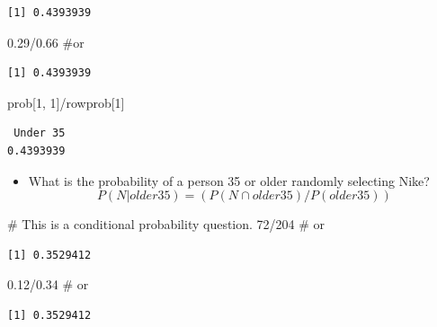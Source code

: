 \documentclass[
  letterpaper,
  DIV=11,
  numbers=noendperiod]{scrreprt}
\newenvironment{Shaded}{\begin{snugshade}}{\end{snugshade}}
\newcommand{\CommentTok}[1]{\textcolor[rgb]{0.37,0.37,0.37}{#1}}
\newcommand{\DecValTok}[1]{\textcolor[rgb]{0.68,0.00,0.00}{#1}}
\newcommand{\FloatTok}[1]{\textcolor[rgb]{0.68,0.00,0.00}{#1}}
\newcommand{\NormalTok}[1]{\textcolor[rgb]{0.00,0.23,0.31}{#1}}
\newcommand{\SpecialCharTok}[1]{\textcolor[rgb]{0.37,0.37,0.37}{#1}}
\providecommand{\tightlist}{%
  \setlength{\itemsep}{0pt}\setlength{\parskip}{0pt}}\usepackage{longtable,booktabs,array}
\begin{document}
\begin{verbatim}
[1] 0.4393939
\end{verbatim}

\begin{Shaded}
\begin{Highlighting}[]
\FloatTok{0.29}\SpecialCharTok{/}\FloatTok{0.66}  \CommentTok{\#or}
\end{Highlighting}
\end{Shaded}

\begin{verbatim}
[1] 0.4393939
\end{verbatim}

\begin{Shaded}
\begin{Highlighting}[]
\NormalTok{prob[}\DecValTok{1}\NormalTok{, }\DecValTok{1}\NormalTok{]}\SpecialCharTok{/}\NormalTok{rowprob[}\DecValTok{1}\NormalTok{]}
\end{Highlighting}
\end{Shaded}

\begin{verbatim}
 Under 35 
0.4393939 
\end{verbatim}

\begin{itemize}
\tightlist
\item
  What is the probability of a person 35 or older randomly selecting
  Nike? \[P(N|older35) = (P(N \cap older35)/P(older35))\]
\end{itemize}

\begin{Shaded}
\begin{Highlighting}[]
\CommentTok{\# This is a conditional probability question.}
\DecValTok{72}\SpecialCharTok{/}\DecValTok{204}  \CommentTok{\# or}
\end{Highlighting}
\end{Shaded}

\begin{verbatim}
[1] 0.3529412
\end{verbatim}

\begin{Shaded}
\begin{Highlighting}[]
\FloatTok{0.12}\SpecialCharTok{/}\FloatTok{0.34}  \CommentTok{\# or}
\end{Highlighting}
\end{Shaded}

\begin{verbatim}
[1] 0.3529412
\end{verbatim}
\end{document}

